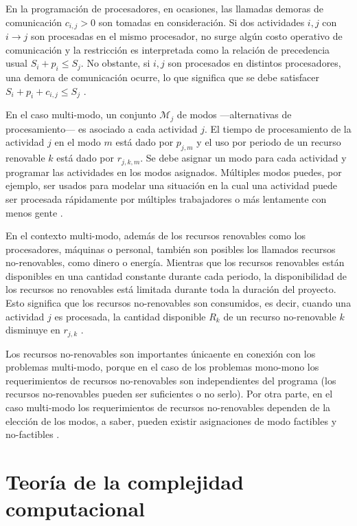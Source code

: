 \documentclass[spanish,draft,12pt,headsepline,footsepline,paper=letter]{scrreprt}
\begin{document}
En la programación de procesadores, en ocasiones, las llamadas demoras de comunicación $c_{i,j} > 0$ son tomadas en consideración. Si dos actividades $i, j$ con $i \to j$ son procesadas en el mismo procesador, no surge algún costo operativo de comunicación y la restricción es interpretada como la relación de precedencia usual $S_i+p_i \leq S_j$. No obstante, si $i,j$ son procesados en distintos procesadores, una demora de comunicación ocurre, lo que significa que se debe satisfacer $S_i+p_i+c_{i,j} \leq S_j$ \citep[p.~5]{Robert2010}.

En el caso multi-modo, un conjunto $\mathcal{M}_j$ de modos —alternativas de procesamiento— es asociado a cada actividad $j$. El tiempo de procesamiento de la actividad $j$ en el modo $m$ está dado por $p_{j,m}$ y el uso por periodo de un recurso renovable $k$ está dado por $r_{j,k,m}$. Se debe asignar un modo para cada actividad y programar las actividades en los modos asignados. Múltiples modos puedes, por ejemplo, ser usados para modelar una situación en la cual una actividad puede ser procesada rápidamente por múltiples trabajadores o más lentamente con menos gente \citep[p.~5]{Robert2010}.

En el contexto multi-modo, además de los recursos renovables como los procesadores, máquinas o personal, también son posibles los llamados recursos no\nobreakdash-renovables, como dinero o energía. Mientras que los recursos renovables están disponibles en una cantidad constante durante cada periodo, la disponibilidad de los recursos no renovables está limitada durante toda la duración del proyecto. Esto significa que los recursos no\nobreakdash-renovables son consumidos, es decir, cuando una actividad $j$ es procesada, la cantidad disponible $R_k$ de un recurso no\nobreakdash-renovable $k$ disminuye en $r_{j,k}$ \citep[p.~5]{Robert2010}.

Los recursos no\nobreakdash-renovables son importantes únicaente en conexión con los problemas multi-modo, porque en el caso de los problemas mono-mono los requerimientos de recursos no\nobreakdash-renovables son independientes del programa (los recursos no\nobreakdash-renovables pueden ser suficientes o no serlo). Por otra parte, en el caso multi-modo los requerimientos de recursos no\nobreakdash-renovables dependen de la elección de los modos, a saber, pueden existir asignaciones de modo factibles y no\nobreakdash-factibles \citep[p.~5]{Robert2010}.

\section{Teoría de la complejidad computacional} %
\label{teoria_complejidad_computacional}
\end{document}
